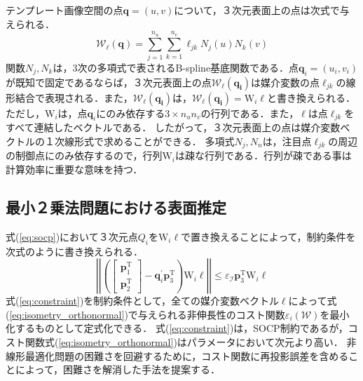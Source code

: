 \documentclass[10.5pt,twocolumn,a4j,fleqn]{ujarticle}
\def\eqref#1{式(\ref{#1})}
\begin{document}
テンプレート画像空間の点$\mathrm{\bm{q}} = (u, v)$について，３次元表面上の点は次式で与えられる．
\begin{equation}
    \mathcal{W}_{\bm{\ell}}(\mathrm{\bm{q}}) = \sum_{j=1}^{n_u}\sum_{k=1}^{n_v} \bm{\ell}_{jk}N_j(u)N_k(v)
\end{equation}
関数$N_{j},N_{k}$は，3次の多項式で表されるB-spline基底関数である．点$\mathrm{\bm{q}}_i = (u_i, v_i)$が既知で固定であるならば，３次元表面上の点$\mathcal{W}_{\bm{\ell}}(\mathrm{\bm{q_i}})$は媒介変数の点$\bm{\ell}_{jk}$の線形結合で表現される．また，$\mathcal{W}_{\bm{\ell}}(\mathrm{\bm{q_i}})$は，$\mathcal{W}_{\bm{\ell}}(\mathrm{\bm{q_i}}) = \mathrm{W}_i\bm{\ell}$と書き換えられる．
ただし，$\mathrm{W}_i$は，点$\mathrm{\bm{q}}_i$にのみ依存する$3\times n_u n_v$の行列である．また，$\bm{\ell}$は点$\bm{\ell}_{jk}$をすべて連結したベクトルである．
したがって，３次元表面上の点は媒介変数ベクトルの１次線形式で求めることができる．
多項式$N_j, N_n$は，注目点$\bm{\ell}_{jk}$の周辺の制御点にのみ依存するので，行列$\mathrm{W}_i$は疎な行列である．行列が疎である事は計算効率に重要な意味を持つ．

\subsection{最小２乗法問題における表面推定}
\eqref{eq:socp}において３次元点$Q_i$を$\mathrm{W}_i\bm{\ell}$で置き換えることによって，制約条件を次式のように書き換えられる．
\begin{equation}
    \left|\left|
    \left( 
        \left[
            \begin{array}{c}
                \mathrm{\bm{p}}_1^{\mathrm{T}}  \\
                \mathrm{\bm{p}}_2^{\mathrm{T}}
            \end{array}
        \right]
        - \bm{q}_i^{\prime}\mathrm{\bm{p}}_3^{\mathrm{T}} 
    \right)\mathrm{W}_i\bm{\ell}
    \right|\right|
    \le \varepsilon_{\mathcal{I}}\mathrm{\bm{p}}_3^{\mathrm{T}}\mathrm{W}_i\bm{\ell}
    \label{eq:constraint}
\end{equation}
\eqref{eq:constraint}を制約条件として，全ての媒介変数ベクトル$\bm{\ell}$によって\eqref{eq:isometry_orthonormal}で与えられる非伸長性のコスト関数$\varepsilon_i(\mathcal{W})$を最小化するものとして定式化できる．
\eqref{eq:constraint}は，SOCP制約であるが，コスト関数\eqref{eq:isometry_orthonormal}はパラメータにおいて次元より高い．
非線形最適化問題の困難さを回避するために，コスト関数に再投影誤差を含めることによって，困難さを解消した手法を提案する．
\end{document}
